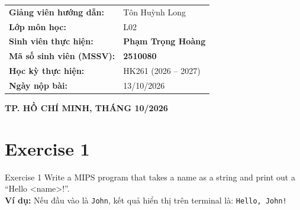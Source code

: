 \documentclass[a4paper]{article}
\numberwithin{figure}{section}
\numberwithin{table}{section}
\begin{document}
\begin{titlepage}
\begin{center}
        \begin{minipage}{0.85\textwidth}
            \begin{tabular}{p{5.5cm}l}
                \textbf{Giảng viên hướng dẫn:} & Tôn Huỳnh Long \\
                \textbf{Lớp môn học:} & L02 \\
                \textbf{Sinh viên thực hiện:} & \textbf{Phạm Trọng Hoàng} \\
                \textbf{Mã số sinh viên (MSSV):} & \textbf{2510080} \\
                \textbf{Học kỳ thực hiện:} & HK261 (2026 -- 2027) \\
                \textbf{Ngày nộp bài:} & 13/10/2026
            \end{tabular}
        \end{minipage}

        \vfill

        \textbf{\large TP. HỒ CHÍ MINH, THÁNG 10/2026}
    \end{center}
\end{titlepage}


\renewcommand{\contentsname}{\centerline{\LARGE MỤC LỤC}}
\hypertarget{mucluc}{}
\tableofcontents

\pagebreak
{}

\section{Exercise 1}

\begin{problembox}{Exercise 1}
Write a MIPS program that takes a name as a string and print out a ``Hello <name>!''.\\
\textbf{Ví dụ:} Nếu đầu vào là \texttt{John}, kết quả hiển thị trên terminal là: \texttt{Hello, John!}
\end{problembox}
\end{document}
